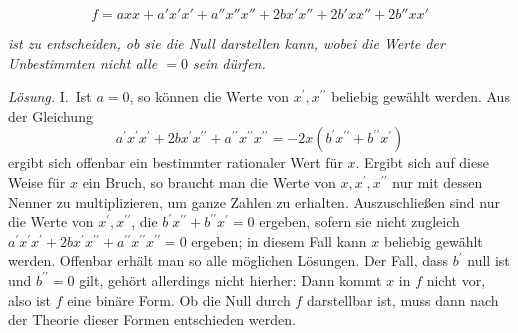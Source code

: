 \[f=axx+a'x'x'+a''x''x''+2bx'x''+2b'xx''+2b''xx'\]

\textit{ist zu entscheiden, ob sie die Null darstellen kann, wobei die Werte der Unbestimmten nicht alle \(=0\) sein dürfen.}

\textit{Lösung.} I.\ Ist \(a=0\), so können die Werte von \(x^\prime,x^{\prime\prime}\) beliebig gewählt werden. Aus der Gleichung
\[a^\prime x^\prime x^\prime+2b x^\prime x^{\prime\prime}+a^{\prime\prime}x^{\prime\prime}x^{\prime\prime}=-2x(b^\prime x^{\prime\prime}+b^{\prime\prime}x^\prime)\]
ergibt sich offenbar ein bestimmter rationaler Wert für \(x\). Ergibt sich auf diese Weise für \(x\) ein Bruch, so braucht man die Werte von \(x,x^\prime,x^{\prime\prime}\) nur mit dessen Nenner zu multiplizieren, um ganze Zahlen zu erhalten. Auszuschließen sind nur die Werte von \(x^\prime,x^{\prime\prime}\), die \(b^\prime x^{\prime\prime}+b^{\prime\prime}x^\prime=0\) ergeben, sofern sie nicht zugleich \(a^\prime x^\prime x^\prime+2b x^\prime x^{\prime\prime}+a^{\prime\prime}x^{\prime\prime}x^{\prime\prime}=0\) ergeben; in diesem Fall kann \(x\) beliebig gewählt werden. Offenbar erhält man so alle möglichen Lösungen. Der Fall, dass \(b^\prime\) null ist und \(b^{\prime\prime}=0\) gilt, gehört allerdings nicht hierher: Dann kommt \(x\) in \(f\) nicht vor, also ist \(f\) eine binäre Form. Ob die Null durch \(f\) darstellbar ist, muss dann nach der Theorie dieser Formen entschieden werden.


